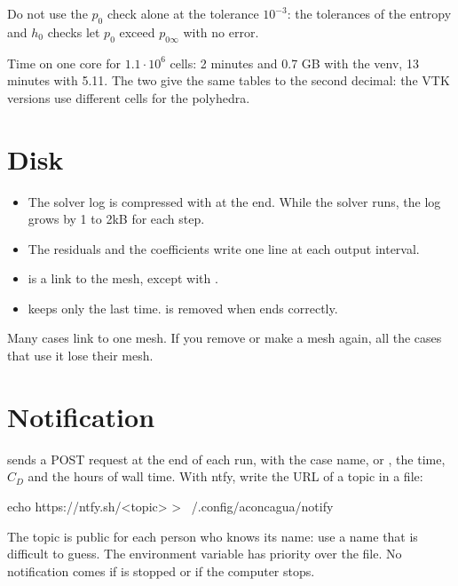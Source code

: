 \begin{note}
Do not use the $p_0$ check alone at the tolerance $10^{-3}$: the tolerances of the
entropy and $h_0$ checks let $p_0$ exceed $p_{0\infty}$ with no error.
\end{note}

Time on one core for $1.1\cdot10^6$ cells: 2 minutes and 0.7 GB with the venv, 13
minutes with  5.11. The two give the same tables to the second decimal: the
VTK versions use different cells for the polyhedra.

\section{Disk}

\begin{itemize}
\item The solver log is compressed with  at the end. While the solver runs,
  the log grows by 1 to \unit{2}{kB} for each step.
\item The residuals and the coefficients write one line at each output interval.
\item {} is a link to the mesh, except with .
\item {} keeps only the last time.  is removed when
   ends correctly.
\end{itemize}

\begin{caution}
Many cases link to one mesh. If you remove or make a mesh again, all the cases that
use it lose their mesh.
\end{caution}

\section{Notification}\label{sec:notify}

 sends a POST request at the end of each run, with the case name,
 or , the time, $C_D$ and the hours of wall time. With ntfy, write
the URL of a topic in a file:

\begin{shell}
echo https://ntfy.sh/<topic> > ~/.config/aconcagua/notify
\end{shell}

The topic is public for each person who knows its name: use a name that is difficult
to guess. The environment variable  has priority over the file. No
notification comes if  is stopped or if the computer stops.
